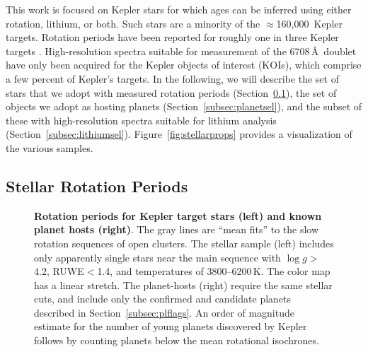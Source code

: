 \documentclass[11pt,twocolumn,tighten]{aastex63}
\newcommand{\nkeplerstars}{$\approx$160{,}000}
\begin{document}
This work is focused on Kepler stars for which ages can be inferred
using either rotation, lithium, or both.  Such stars are a minority of
the \nkeplerstars\ Kepler targets.  Rotation periods have been
reported for roughly one in three Kepler targets
\citep[e.g.][]{McQuillan_2014,Santos_2021}.  High-resolution spectra
suitable for measurement of the  6708\,\AA\ doublet have
only been acquired for the Kepler objects of interest (KOIs), which
comprise a few percent of Kepler's targets.  In the following, we will
describe the set of stars that we adopt with measured rotation periods
(Section~\ref{subsec:rotsel}), the set of objects we adopt as hosting
planets (Section~\ref{subsec:planetsel}), and the subset of these with
high-resolution spectra suitable for lithium analysis
(Section~\ref{subsec:lithiumsel}).  Figure~\ref{fig:stellarprops}
provides a visualization of the various samples.


\subsection{Stellar Rotation Periods}
\label{subsec:rotsel}


\begin{figure}[!t]
	\begin{center}
	\end{center}
	\vspace{-0.5cm}
	\caption{
    {\bf Rotation periods for Kepler target stars (left) and known
    planet hosts (right)}.  
    The gray lines are ``mean fits'' to the slow rotation sequences of
    open clusters.  The stellar sample (left) includes only apparently
    single stars near the main sequence with $\log g$$>$4.2,
    RUWE$<$1.4, and temperatures of 3800--6200\,K.  The color map has
    a linear stretch.  The planet-hosts (right) require the same
    stellar cuts, and include only the confirmed and candidate planets
    described in Section~\ref{subsec:plflags}.  An order of magnitude
    estimate for the number of young planets discovered by Kepler
    follows by counting planets below the mean rotational isochrones.
	}
	\label{fig:prot_vs_teff}
\end{figure}
\end{document}
